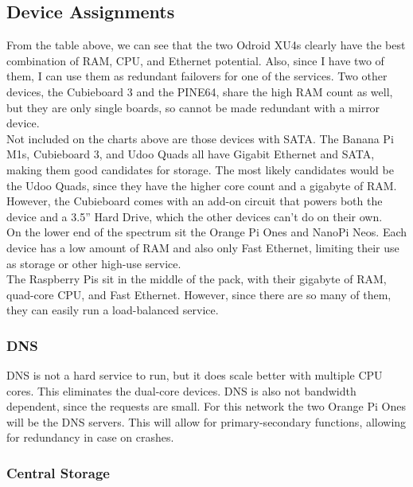 \documentclass[12pt]{spieman}  %
\begin{document}
\subsection{Device Assignments}
\label{subsec:dev-assignment}
From the table above, we can see that the two Odroid XU4s clearly have the best combination of RAM, CPU, and Ethernet potential. Also, since I have two of them, I can use them as redundant failovers for one of the services. Two other devices, the Cubieboard 3 and the PINE64, share the high RAM count as well, but they are only single boards, so cannot be made redundant with a mirror device.\\

Not included on the charts above are those devices with SATA. The Banana Pi M1s, Cubieboard 3, and Udoo Quads all have Gigabit Ethernet and SATA, making them good candidates for storage. The most likely candidates would be the Udoo Quads, since they have the higher core count and a gigabyte of RAM. However, the Cubieboard comes with an add-on circuit that powers both the device and a 3.5” Hard Drive, which the other devices can’t do on their own.\\

On the lower end of the spectrum sit the Orange Pi Ones and NanoPi Neos. Each device has a low amount of RAM and also only Fast Ethernet, limiting their use as storage or other high-use service.\\

The Raspberry Pis sit in the middle of the pack, with their gigabyte of RAM, quad-core CPU, and Fast Ethernet. However, since there are so many of them, they can easily run a load-balanced service.

\subsubsection{DNS}
\label{subsubsec:dns}

DNS is not a hard service to run, but it does scale better with multiple CPU cores. This eliminates the dual-core devices. DNS is also not bandwidth dependent, since the requests are small. For this network the two Orange Pi Ones will be the DNS servers. This will allow for primary-secondary functions, allowing for redundancy in case on crashes.

\subsubsection{Central Storage}
\label{subsubsec:storage}
\end{document}
